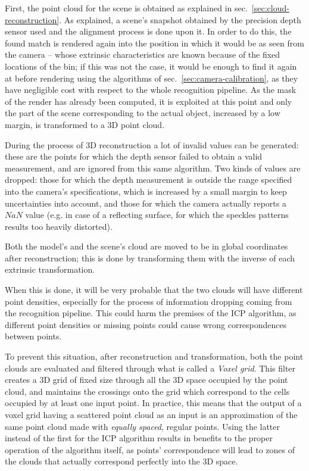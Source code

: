 First, the point cloud for the scene is obtained as explained in sec.~\ref{sec:cloud-reconstruction}.
As explained, a scene's snapshot obtained by the precision depth
sensor used and the alignment process is done upon it. In order to
do this, the found match is rendered again into the position in which
it would be as seen from the camera -- whose extrinsic characteristics
are known because of the fixed locations of the bin; if this was not
the case, it would be enough to find it again at before rendering
using the algorithms of sec.~\ref{sec:camera-calibration}, as they
have negligible cost with respect to the whole recognition pipeline.
As the mask of the render has already been computed, it is exploited at this
point and only the part of the scene corresponding to the actual
object, increased by a low margin, is
transformed to a 3D point cloud.

During the process of 3D reconstruction a lot of invalid values can be
generated: these are the points for which the depth sensor failed to obtain a
valid measurement, and are ignored from this same algorithm. Two kinds
of values are dropped: those for which the depth measurement is
outside the range specified into the camera's specifications, which
is increased by a small margin to keep uncertainties into account, and
those for which the camera actually reports a $NaN$ value (e.g. in
case of a reflecting surface, for which the speckles patterns results
too heavily distorted).

Both the model's and the scene's cloud are moved to be in global
coordinates after reconstruction; this is done by transforming them
with the inverse of each extrinsic transformation.

When this is done, it will be very probable that the two clouds will
have different point densities, especially for the process of
information dropping coming from the recognition pipeline. This could
harm the premises of the ICP algorithm, as different point densities
or missing points could cause wrong correspondences between points.

To prevent this situation, after reconstruction and transformation,
both the point clouds are evaluated and filtered through what is
called a \emph{Voxel grid}. This filter creates a 3D grid of fixed
size through all the 3D space occupied by the point cloud, and
maintains the crossings onto the grid which correspond to the cells
occupied by at least one input point. In practice, this means that the
output of a voxel grid having a scattered point cloud as an input is
an approximation of the same point cloud made with \emph{equally
  spaced}, regular points. Using the latter instead of the first for
the ICP algorithm results in benefits to the proper
operation of the algorithm itself, as points' correspondence will
lead to zones of the clouds that actually correspond perfectly into the 3D space.

